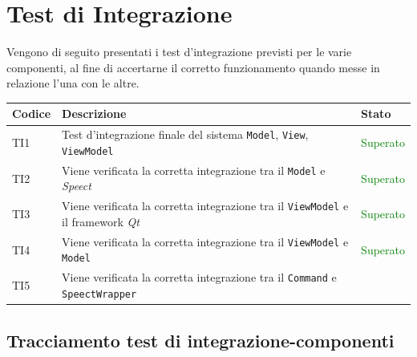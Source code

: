 \documentclass[openany,12pt,a4paper]{report}
\begin{document}
\section{Test di Integrazione}

Vengono di seguito presentati i test d'integrazione previsti per le varie componenti, al fine di accertarne il corretto funzionamento quando messe in relazione l'una con le altre.

\setlength\LTleft{6mm}
\begin{longtable}{| p{2.5cm} |p{5cm} | p{2.5cm} |}
	\hline
	\textbf{Codice} & \textbf{Descrizione} & \textbf{Stato}\\
	\hline
	\endhead
	\newline TI1&
	\newline Test d'integrazione finale del sistema \verb|Model|, \verb|View|, \verb|ViewModel|&
	\newline \textcolor{green}{Superato}
	\\[1em]
	\hline
	\newline TI2&
	\newline Viene verificata la corretta integrazione tra il  \verb|Model| e \textit{Speect}&
	\newline \textcolor{green}{Superato}
	\\[1em]
	\hline
	\newline TI3&
	\newline Viene verificata la corretta integrazione tra il  \verb|ViewModel| e il framework \textit{Qt}&
	\newline \textcolor{green}{Superato} 
	\\[1em]
	\hline
	\newline TI4&
	\newline Viene verificata la corretta integrazione tra il  \verb|ViewModel| e \verb|Model|&
	\newline \textcolor{green}{Superato}
	\\[1em]
	\hline
	\newline TI5&
	\newline Viene verificata la corretta integrazione tra il  \verb|Command| e \verb|SpeectWrapper|&
	\newline \color{green}{Superato}
	\\[1em]
	\hline
\end{longtable}

\subsection{Tracciamento test di integrazione-componenti}
\end{document}

